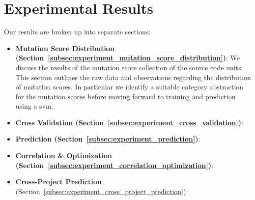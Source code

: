 \section{Experimental Results}
\label{sec:experiment_results}
Our results are broken up into separate sections:

\begin{itemize}
  \item \textbf{Mutation Score Distribution (Section~\ref{subsec:experiment_mutation_score_distribution})}: We discuss the results of the mutation score collection of the source code units. This section outlines the raw data and observations regarding the distribution of mutation scores. In particular we identify a suitable category abstraction for the mutation scores before moving forward to training and prediction using a \gls{svm}.
  \item \textbf{Cross Validation (Section~\ref{subsec:experiment_cross_validation})}:
  \item \textbf{Prediction (Section~\ref{subsec:experiment_prediction})}:
  \item \textbf{Correlation \& Optimization (Section~\ref{subsec:experiment_correlation_optimization})}:
  \item \textbf{Cross-Project Prediction} (Section~\ref{subsec:experiment_cross_project_prediction}):
\end{itemize}


